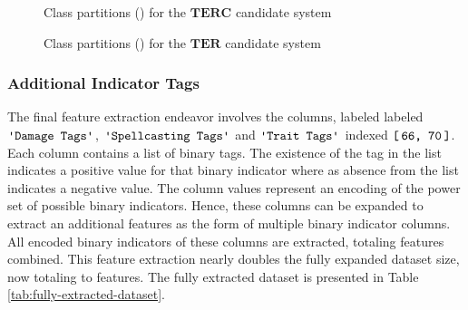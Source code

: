 \documentclass{article}
\newcommand{\Qty}[1]{\oldstylenums{#1}}
\newcommand{\TER}{\ensuremath{\mathbf{TER}}\xspace}
\newcommand{\TERC}{\ensuremath{\mathbf{TERC}}\xspace}
\newcommand{\Column}[1]{\ensuremath{\texttt{\textquotesingle{}#1\textquotesingle{}}}\xspace}
\newcommand{\IndexRange}[2]{\ensuremath{\texttt{{[}\,#1,\ #2\,{]}}}\xspace}
\begin{document}
\begin{figure}[htb]
	\centering
	\caption{Class partitions (\Qty{12}) for the \TERC candidate system}\label{fig:Partitions-TERC}
\end{figure}

\begin{figure}[htb]
	\centering
	\caption{Class partitions (\Qty{22}) for the \TER candidate system}\label{fig:Partitions-TER}
\end{figure}


\hypertarget{extraction-of-indicator-tags}{
\subsubsection{Additional Indicator Tags}\label{extraction-of-indicator-tags}}

The final feature extraction endeavor involves the columns, labeled
labeled \Column{Damage\ Tags}, \Column{Spellcasting\ Tags} and \Column{Trait\ Tags} indexed \IndexRange{66}{70}.
Each column contains a list of binary tags.
The existence of the tag in the list indicates a positive value for that binary indicator where as absence from the list indicates a negative value.
The column values represent an encoding of the power set of possible binary indicators.
Hence, these columns can be expanded to extract an additional features as the form of multiple binary indicator columns.
All encoded binary indicators of these columns are extracted, totaling \Qty{63} features combined.
This feature extraction nearly doubles the fully expanded dataset size, now totaling to \Qty{136} features.
The fully extracted dataset is presented in Table \ref{tab:fully-extracted-dataset}.
\end{document}
